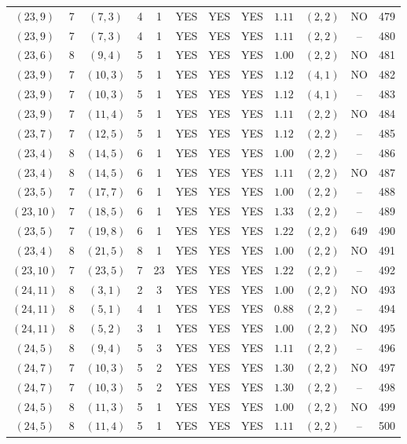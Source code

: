 \begin{longtable}{|c|c|c|c|c|c|c|c|c|c|c|c|}
$(23,9)$ & 7 & $(7,3)$ & 4 & 1 & YES & YES & YES & $1.11$ & $(2,2)$ & NO & 479\\
$(23,9)$ & 7 & $(7,3)$ & 4 & 1 & YES & YES & YES & $1.11$ & $(2,2)$ & -- & 480\\
$(23,6)$ & 8 & $(9,4)$ & 5 & 1 & YES & YES & YES & $1.00$ & $(2,2)$ & NO & 481\\
$(23,9)$ & 7 & $(10,3)$ & 5 & 1 & YES & YES & YES & $1.12$ & $(4,1)$ & NO & 482\\
$(23,9)$ & 7 & $(10,3)$ & 5 & 1 & YES & YES & YES & $1.12$ & $(4,1)$ & -- & 483\\
$(23,9)$ & 7 & $(11,4)$ & 5 & 1 & YES & YES & YES & $1.11$ & $(2,2)$ & NO & 484\\
$(23,7)$ & 7 & $(12,5)$ & 5 & 1 & YES & YES & YES & $1.12$ & $(2,2)$ & -- & 485\\
$(23,4)$ & 8 & $(14,5)$ & 6 & 1 & YES & YES & YES & $1.00$ & $(2,2)$ & -- & 486\\
$(23,4)$ & 8 & $(14,5)$ & 6 & 1 & YES & YES & YES & $1.11$ & $(2,2)$ & NO & 487\\
$(23,5)$ & 7 & $(17,7)$ & 6 & 1 & YES & YES & YES & $1.00$ & $(2,2)$ & -- & 488\\
$(23,10)$ & 7 & $(18,5)$ & 6 & 1 & YES & YES & YES & $1.33$ & $(2,2)$ & -- & 489\\
$(23,5)$ & 7 & $(19,8)$ & 6 & 1 & YES & YES & YES & $1.22$ & $(2,2)$ & 649 & 490\\
$(23,4)$ & 8 & $(21,5)$ & 8 & 1 & YES & YES & YES & $1.00$ & $(2,2)$ & NO & 491\\
$(23,10)$ & 7 & $(23,5)$ & 7 & 23 & YES & YES & YES & $1.22$ & $(2,2)$ & -- & 492\\
$(24,11)$ & 8 & $(3,1)$ & 2 & 3 & YES & YES & YES & $1.00$ & $(2,2)$ & NO & 493\\
$(24,11)$ & 8 & $(5,1)$ & 4 & 1 & YES & YES & YES & $0.88$ & $(2,2)$ & -- & 494\\
$(24,11)$ & 8 & $(5,2)$ & 3 & 1 & YES & YES & YES & $1.00$ & $(2,2)$ & NO & 495\\
$(24,5)$ & 8 & $(9,4)$ & 5 & 3 & YES & YES & YES & $1.11$ & $(2,2)$ & -- & 496\\
$(24,7)$ & 7 & $(10,3)$ & 5 & 2 & YES & YES & YES & $1.30$ & $(2,2)$ & NO & 497\\
$(24,7)$ & 7 & $(10,3)$ & 5 & 2 & YES & YES & YES & $1.30$ & $(2,2)$ & -- & 498\\
$(24,5)$ & 8 & $(11,3)$ & 5 & 1 & YES & YES & YES & $1.00$ & $(2,2)$ & NO & 499\\
$(24,5)$ & 8 & $(11,4)$ & 5 & 1 & YES & YES & YES & $1.11$ & $(2,2)$ & -- & 500\\

\end{longtable}
